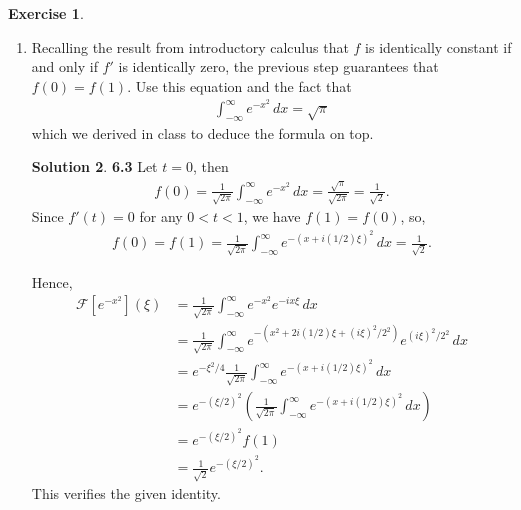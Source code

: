 \documentclass{book}
\theoremstyle{definition}
\newtheorem*{exer*}{Exercise}
\newtheorem*{sln*}{Solution}
\newcommand{\F}{\mathcal{F}}
\newcommand{\f}[2]{\frac{#1}{#2}}
\newcommand{\lp}{\left(}
\newcommand{\rp}{\right)}
\begin{document}
\begin{exer*}
\begin{enumerate}
		\begin{sln*}\textbf{6.2} By change of variables: $y = x + i(t/2)\xi$, we have $dy = dx$, so:
			\begin{align*}
			\f{1}{\sqrt{2\pi}} \int^\infty_{-\infty} -i\xi (x + i(t/2)\xi)e^{-(x + i(t/2)\xi)^2}\,dx = -\f{i\xi}{\sqrt{2\pi}} \int^\infty_{-\infty} y e^{-y^2}\,dy.
			\end{align*}
			Since $y$ is an odd function, $e^{-y^2}$ is an even function, and that the domain of integration is symmetric, $f'(t) = 0$.
			
		\end{sln*}
	
	
	
		\item Recalling the result from introductory calculus that $f$ is identically constant if and only if $f'$ is identically zero, the previous step guarantees that $f(0) = f(1)$. Use this equation and the fact that 
		\begin{align*}
		\int^\infty_{-\infty} e^{-x^2}\,dx = \sqrt{\pi}
		\end{align*}
		which we derived in class to deduce the formula on top.
		
		\begin{sln*}\textbf{6.3} Let $t = 0$, then 
			\begin{align*}
			f(0) = \f{1}{\sqrt{2\pi}} \int^\infty_{-\infty} e^{-x^2}\,dx = \f{\sqrt{\pi}}{\sqrt{2\pi}} = \f{1}{\sqrt{2}}.
			\end{align*}
			Since $f'(t) = 0$ for any $0 < t < 1$, we have $f(1) = f(0)$, so,
			\begin{align*}
			f(0) = f(1) = \f{1}{\sqrt{2\pi}} \int^\infty_{-\infty} e^{-(x+ i(1/2)\xi)^2}\,dx = \f{1}{\sqrt{2}}.
			\end{align*}
			
			Hence,
			\begin{align*}
			\F[e^{-x^2}](\xi) &= \f{1}{\sqrt{2\pi}}\int^{\infty}_{-\infty} e^{-x^2} e^{-ix\xi}\,dx\\
			&=  \f{1}{\sqrt{2\pi}}\int^{\infty}_{-\infty} e^{-(x^2 + 2i(1/2)\xi + (i\xi)^2/2^2 )} e^{(i\xi)^2/2^2}\,dx\\
			&= e^{-\xi^2/4}\f{1}{\sqrt{2\pi}}\int^{\infty}_{-\infty} e^{-(x + i(1/2)\xi )^2} \,dx\\
			&= e^{-(\xi/2)^2} \lp \f{1}{\sqrt{2\pi}}\int^{\infty}_{-\infty} e^{-(x + i(1/2)\xi )^2} \,dx  \rp\\
			&= e^{-(\xi/2)^2} f(1)\\
			&= \f{1}{\sqrt{2}}e^{-(\xi/2)^2}.
			\end{align*}
			This verifies the given identity. 
			
		\end{sln*}
	\end{enumerate}

\end{exer*}
\end{document}
